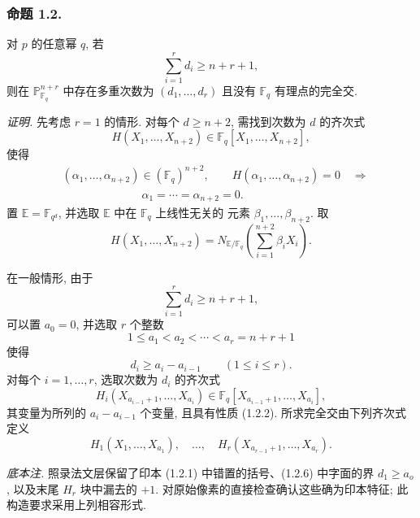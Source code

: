 \subsubsection*{命题 1.2.}
对 $p$ 的任意幂 $q$, 若
\begin{equation*}
\sum_{i=1}^{r}d_i\geq n+r+1,
\end{equation*}
则在 $\mathbb P^{n+r}_{\mathbb F_q}$ 中存在多重次数为 $(d_1,\dots,d_r)$
且没有 $\mathbb F_q$ 有理点的完全交.

\medskip
\noindent\emph{证明.}
先考虑 $r=1$ 的情形. 对每个 $d\geq n+2$, 需找到次数为 $d$ 的齐次式
\begin{equation}\tag{1.2.1}
H(X_1,\dots,X_{n+2})\in
\mathbb F_q[X_1,\dots,X_{n+2}],
\end{equation}
使得
\begin{equation}\tag{1.2.2}
\begin{aligned}
&(\alpha_1,\dots,\alpha_{n+2})\in(\mathbb F_q)^{n+2},\qquad
H(\alpha_1,\dots,\alpha_{n+2})=0\quad\Longrightarrow\\
&\hspace{7em}\alpha_1=\cdots=\alpha_{n+2}=0.
\end{aligned}
\end{equation}
置 $\mathbb E=\mathbb F_{q^d}$, 并选取 $\mathbb E$ 中在 $\mathbb F_q$ 上线性无关的
元素 $\beta_1,\dots,\beta_{n+2}$. 取
\begin{equation}\tag{1.2.3}
H(X_1,\dots,X_{n+2})=
N_{\mathbb E/\mathbb F_q}
\left(\sum_{i=1}^{n+2}\beta_iX_i\right).
\end{equation}

在一般情形, 由于
\begin{equation}\tag{1.2.4}
\sum_{i=1}^{r}d_i\geq n+r+1,
\end{equation}
可以置 $a_0=0$, 并选取 $r$ 个整数
\begin{equation}\tag{1.2.5}
1\leq a_1<a_2<\cdots<a_r=n+r+1
\end{equation}
使得
\begin{equation}\tag{1.2.6}
d_i\geq a_i-a_{i-1}\qquad(1\leq i\leq r).
\end{equation}
对每个 $i=1,\dots,r$, 选取次数为 $d_i$ 的齐次式
\begin{equation*}
H_i(X_{a_{i-1}+1},\dots,X_{a_i})
\in\mathbb F_q[X_{a_{i-1}+1},\dots,X_{a_i}],
\end{equation*}
其变量为所列的 $a_i-a_{i-1}$ 个变量, 且具有性质 (1.2.2).
所求完全交由下列齐次式定义
\begin{equation*}
H_1(X_1,\dots,X_{a_1}),\quad\dots,\quad
H_r(X_{a_{r-1}+1},\dots,X_{a_r}).
\end{equation*}

\medskip
\noindent\emph{底本注.}
照录法文层保留了印本 (1.2.1) 中错置的括号、(1.2.6) 中字面的界 $d_1\geq a_o$,
以及末尾 $H_r$ 块中漏去的 $+1$. 对原始像素的直接检查确认这些确为印本特征;
此构造要求采用上列相容形式.
